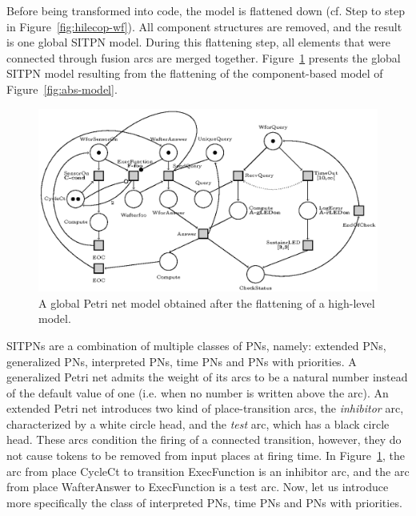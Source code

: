 Before being transformed into \vhdl{} code, the model is flattened
down (cf. Step  to step  in
Figure~\ref{fig:hilecop-wf}). All component structures are removed,
and the result is one global SITPN model. During this flattening step,
all elements that were connected through fusion arcs are merged
together. Figure~\ref{fig:impl-model} presents the global SITPN model
resulting from the flattening of the component-based model of
Figure~\ref{fig:abs-model}.

\begin{figure}[H]
\centering
\includegraphics[keepaspectratio=true,width=\textwidth] {impl-model.eps}
\caption[Global Petri net model.]{A global Petri net model obtained
  after the flattening of a \hilecop{} high-level model.}
\label{fig:impl-model}
\end{figure}

SITPNs are a combination of multiple classes of PNs, namely: extended
PNs, generalized PNs, interpreted PNs, time PNs and PNs with
priorities. A generalized Petri net admits the weight of its arcs to
be a natural number instead of the default value of one (i.e. when no
number is written above the arc). An extended Petri net introduces two
kind of place-transition arcs, the \textit{inhibitor} arc,
characterized by a white circle head, and the \textit{test} arc, which
has a black circle head. These arcs condition the firing of a
connected transition, however, they do not cause tokens to be removed
from input places at firing time. In Figure~\ref{fig:impl-model}, the
arc from place CycleCt to transition ExecFunction is an inhibitor arc,
and the arc from place WafterAnswer to ExecFunction is a test arc.
Now, let us introduce more specifically the class of interpreted PNs,
time PNs and PNs with priorities.

